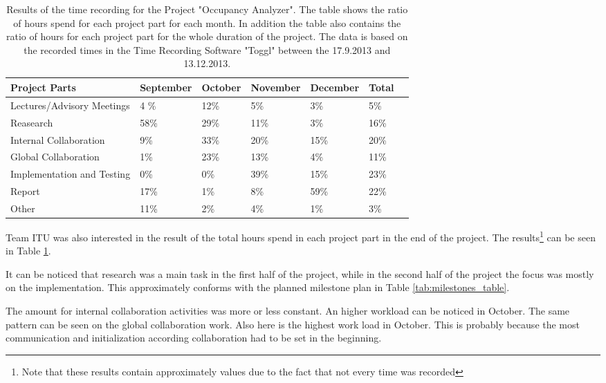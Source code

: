 \begin{table}[htb]
	\centering
	\begin{tabular}{ |  p{} |  p{2cm} |  p{2cm} |  p{2cm} |  p{2cm} |  p{2cm} |  p{2cm}|}
    		\hline
   		Project Parts & September & October & November & December & Total\\ \hline
    		Lectures/Advisory Meetings & 4 \% & 12\% & 5\% & 3\% & 5\% \\ \hline
    		Reasearch & 58\% & 29\% & 11\% & 3\% & 16\% \\ \hline
		Internal Collaboration & 9\% & 33\% & 20\% & 15\% & 20\%\\ \hline
    		Global Collaboration & 1\% & 23\% & 13\% & 4\% & 11\%\\ \hline
    		Implementation and Testing & 0\% & 0\% & 39\% & 15\% & 23\% \\ \hline
    		Report & 17\% & 1\%  & 8\% & 59\% & 22\% \\ \hline
 		Other & 11\% & 2\% & 4\% & 1\% & 3\%\\ \hline
	\end{tabular}
	\caption{Results of the time recording for the Project "Occupancy Analyzer". The table shows the ratio of hours spend for each project part for each month. In addition the table also contains the ratio of hours for each project part for the whole duration of the project. The data is based on the recorded times in the Time Recording Software "Toggl" between the 17.9.2013 and 13.12.2013.}
	\label{tab:timeRecResults}
\end{table}

Team ITU was also interested in the result of the total hours spend in each project part in the end of the project. The results\footnote{Note that these results contain approximately values due to the fact that not every time was recorded} can be seen in Table \ref{tab:timeRecResults}.

It can be noticed that research was a main task in the first half of the project, while in the second half of the project the focus was mostly on the implementation. This approximately conforms with the planned milestone plan in Table \ref{tab:milestones_table}.

The amount for internal collaboration activities was more or less constant. An higher workload can be noticed in October. The same pattern can be seen on the global collaboration work. Also here is the highest work load in October. This is probably because the most communication and initialization according collaboration had to be set in the beginning.

